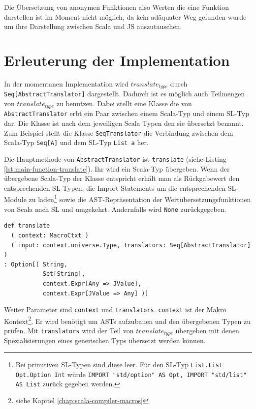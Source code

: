 \documentclass[12pt,bibtotoc]{scrreprt}
\begin{document}
Die Übersetzung von anonymen Funktionen also Werten die eine Funktion darstellen ist im Moment nicht möglich, da kein adäquater Weg gefunden wurde um ihre Darstellung zwischen Scala und JS auszutauschen.

\section{Erleuterung der Implementation}
\label{sec:trans-implementation}

In der momentanen Implementation wird $translate_{type}$ durch \lstinline!Seq[AbstractTranslator]! dargestellt. Dadurch ist es möglich auch Teilmengen von $translate_{type}$ zu benutzen. Dabei stellt eine Klasse die von \lstinline!AbstractTranslator! erbt ein Paar zwischen einem Scala-Typ und einem SL-Typ dar. Die Klasse ist nach dem jeweiligen Scala Typen den sie übersetzt benannt. Zum Beispiel stellt die Klasse \lstinline!SeqTranslator! die Verbindung zwischen dem Scala-Typ \lstinline!Seq[A]! und dem SL-Typ \lstinline!List a! her. 

Die Hauptmethode von \lstinline!AbstractTranslator! ist \lstinline!translate! (siehe Listing \ref{lst:main-function-translate}). Ihr wird ein Scala-Typ übergeben. Wenn der übergebene Scala-Typ der Klasse entspricht erhält man als Rückgabewert den entsprechenden SL-Typen, die Import Statements um die entsprechenden SL-Module zu laden\footnote{Bei primitiven SL-Typen sind diese leer. Für den SL-Typ \lstinline!List.List Opt.Option Int! würde \lstinline!IMPORT "std/option" AS Opt, IMPORT "std/list" AS List! zurück gegeben werden.} sowie die \ac{AST}-Repräsentation der Wertübersetzungsfunktionen von Scala nach SL und umgekehrt. Andernfalls wird \lstinline!None! zurückgegeben.

\begin{lstlisting}[caption=Hauptfunktion in AbstractTranslator, label=lst:main-function-translate]
def translate
  ( context: MacroCtxt )
  ( input: context.universe.Type, translators: Seq[AbstractTranslator] )
: Option[( String, 
           Set[String], 
           context.Expr[Any => JValue], 
           context.Expr[JValue => Any] )]
\end{lstlisting}

Weiter Parameter sind \lstinline!context! und \lstinline!translators!. \lstinline!context! ist der Makro Kontext\footnote{siehe Kapitel \ref{chap:scala-compiler-macros}}. Er wird benötigt um \ac{AST}s aufzubauen und den übergebenen Typen zu prüfen. Mit \lstinline!translators! wird der Teil von $translate_{type}$ übergeben mit denen Spezialisierungen eines generischen Typs übersetzt werden können.
\end{document}
